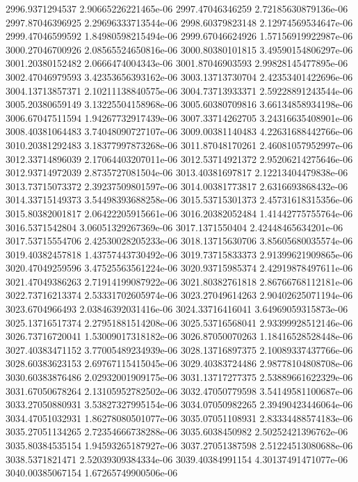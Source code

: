 {2996.9371294537 2.90665226221465e-06
2997.47046346259 2.72185630879136e-06
2997.87046396925 2.29696333713544e-06
2998.60379823148 2.12974569534647e-06
2999.47046599592 1.84980598215494e-06
2999.67046624926 1.57156919922987e-06
3000.27046700926 2.08565524650816e-06
3000.80380101815 3.49590154806297e-06
3001.20380152482 2.0666474004343e-06
3001.87046903593 2.99828145477895e-06
3002.47046979593 3.42353656393162e-06
3003.13713730704 2.42353401422696e-06
3004.13713857371 2.10211138840575e-06
3004.73713933371 2.59228891243544e-06
3005.20380659149 3.13225504158968e-06
3005.60380709816 3.66134858934198e-06
3006.67047511594 1.94267732917439e-06
3007.33714262705 3.24316635408901e-06
3008.40381064483 3.74048090727107e-06
3009.00381140483 4.22631688442766e-06
3010.20381292483 3.18377997873268e-06
3011.87048170261 2.46081057952997e-06
3012.33714896039 2.17064403207011e-06
3012.53714921372 2.95206214275646e-06
3012.93714972039 2.8735727081504e-06
3013.40381697817 2.12213404479838e-06
3013.73715073372 2.39237509801597e-06
3014.00381773817 2.6316693868432e-06
3014.33715149373 3.54498393688258e-06
3015.53715301373 2.45731618315356e-06
3015.80382001817 2.06422205915661e-06
3016.20382052484 1.41442775755764e-06
3016.5371542804 3.06051329267369e-06
3017.1371550404 2.42448465634201e-06
3017.53715554706 2.42530028205233e-06
3018.13715630706 3.85605680035574e-06
3019.40382457818 1.43757443730492e-06
3019.73715833373 2.91399621909865e-06
3020.47049259596 3.47525563561224e-06
3020.93715985374 2.42919878497611e-06
3021.47049386263 2.71914199087922e-06
3021.80382761818 2.86766768112181e-06
3022.73716213374 2.53331702605974e-06
3023.27049614263 2.90402625071194e-06
3023.6704966493 2.03846392031416e-06
3024.33716416041 3.64969059315873e-06
3025.13716517374 2.27951881514208e-06
3025.53716568041 2.93399928512146e-06
3026.73716720041 1.53009017318182e-06
3026.87050070263 1.18416528528448e-06
3027.40383471152 3.77005489234939e-06
3028.13716897375 2.10089337437766e-06
3028.60383623153 2.69767115415045e-06
3029.40383724486 2.98778104808708e-06
3030.60383876486 2.02932001909175e-06
3031.13717277375 2.53889661622329e-06
3031.67050678264 2.13105952782502e-06
3032.47050779598 3.54149581100687e-06
3033.27050880931 3.53827327995154e-06
3034.07050982265 2.39490423446064e-06
3034.47051032931 1.86278080501077e-06
3035.07051108931 2.83334488574183e-06
3035.27051134265 2.72354666738288e-06
3035.6038450982 2.50252421396762e-06
3035.80384535154 1.94593265187927e-06
3037.27051387598 2.51224513080688e-06
3038.5371821471 2.52039309384334e-06
3039.40384991154 4.30137491471077e-06
3040.00385067154 1.67265749900506e-06
}
